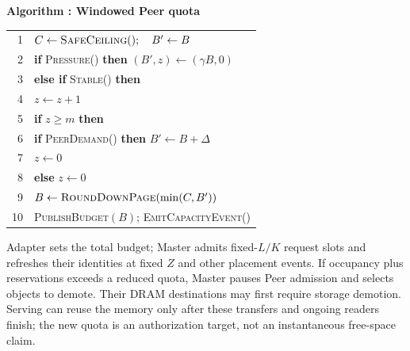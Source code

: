 \par\medskip\noindent\begin{minipage}{\columnwidth}
\raggedright
 \label{alg:adapter}
 \textbf{Algorithm \thedesignalgorithm: Windowed Peer quota}
 \par\smallskip
 \begin{tabularx}{\columnwidth}{@{}r@{\quad}X@{}}
 \toprule
 1 & $C\gets\textsc{SafeCeiling}();\quad B'\gets B$ \\
 2 & \textbf{if} \textsc{Pressure}() \textbf{then} $(B',z)\gets(\gamma B,0)$ \\
 3 & \textbf{else if} \textsc{Stable}() \textbf{then} \\
 4 & \quad $z\gets z+1$ \\
 5 & \quad \textbf{if} $z\ge m$ \textbf{then} \\
 6 & \qquad \textbf{if} \textsc{PeerDemand}() \textbf{then} $B'\gets B+\Delta$ \\
 7 & \qquad $z\gets0$ \\
 8 & \textbf{else} $z\gets0$ \\
 9 & $B\gets\textsc{RoundDownPage}(\min(C,B'))$ \\
 10 & \textsc{PublishBudget}$(B)$; \textsc{EmitCapacityEvent}() \\
 \bottomrule
 \end{tabularx}
\end{minipage}\par\medskip

Adapter sets the total budget; Master admits fixed-$L/K$ request slots
and refreshes their identities at fixed $Z$ and other placement events. If occupancy plus reservations exceeds a reduced
quota, Master pauses Peer admission and selects objects to demote. Their
DRAM destinations may first require storage demotion. Serving can reuse
the memory only after these transfers and ongoing readers finish; the
new quota is an authorization target, not an instantaneous free-space claim.
